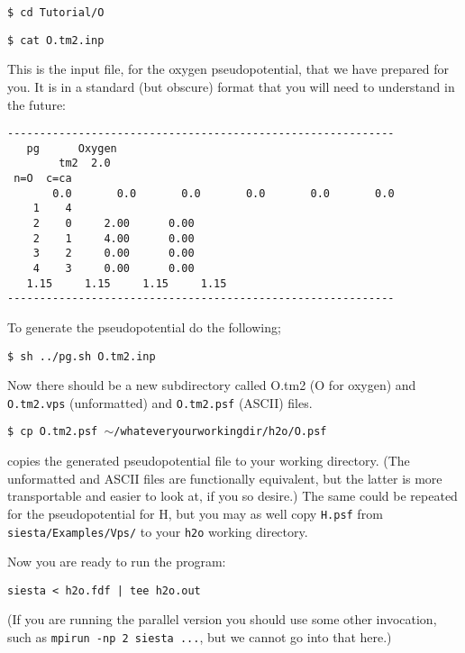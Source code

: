 \documentclass[11pt]{article}
\begin{document}
{\tt \$ cd Tutorial/O}

{\tt \$ cat O.tm2.inp}

\noindent
This is the input file, for the oxygen pseudopotential, 
that we have prepared for you. 
It is in a standard (but obscure) format that
you will need to understand in the future:
\begin{verbatim}
------------------------------------------------------------
   pg      Oxygen
        tm2  2.0
 n=O  c=ca 
       0.0       0.0       0.0       0.0       0.0       0.0
    1    4
    2    0     2.00      0.00
    2    1     4.00      0.00
    3    2     0.00      0.00
    4    3     0.00      0.00
   1.15     1.15     1.15     1.15
------------------------------------------------------------
\end{verbatim}

To generate the pseudopotential do the following;

{\tt \$ sh ../pg.sh O.tm2.inp}

\noindent
Now there should be a new subdirectory called O.tm2 (O for oxygen)
and {\tt O.tm2.vps} (unformatted) and {\tt O.tm2.psf} (ASCII) files.

{\tt \$ cp O.tm2.psf $\sim$/whateveryourworkingdir/h2o/O.psf}

\noindent
copies the generated pseudopotential file to your working directory. 
(The unformatted and ASCII files are functionally equivalent, but
the latter is more transportable and easier to look at, if you so
desire.) The same could be repeated for the pseudopotential for H,
but you may as well copy {\tt H.psf} from {\tt siesta/Examples/Vps/}
to your {\tt h2o} working directory.

\noindent
Now you are ready to run the program:

{\tt siesta < h2o.fdf | tee h2o.out}

\noindent
(If you are running the parallel version you should use some other 
invocation, such as {\tt mpirun -np 2 siesta ...}, but we cannot 
go into that here.)
\end{document}
